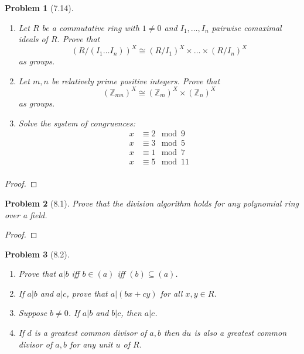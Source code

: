 \documentclass[10pt]{article}
\newcommand{\sk}{\vskip 10mm}
\newcommand{\bb}[1]{\mathbb{#1}}
\theoremstyle{plain}
\newtheorem{problem}{Problem}
\theoremstyle{remark}
\begin{document}
\begin{problem}[7.14]
  \begin{enumerate}
  \item Let $R$ be a commutative ring with $1\neq 0$ and $I_1,\ldots,I_n$
    pairwise comaximal ideals of $R$. Prove that
    \[ (R/(I_1\ldots I_n))^X\cong (R/I_1)^X\times\ldots\times(R/I_n)^X \]
    as groups.
  \item Let $m,n$ be relatively prime positive integers. Prove that
    \[ (\bb{Z}_{mn})^X\cong (\bb{Z}_m)^X\times(\bb{Z}_n)^X \]
    as groups.
  \item Solve the system of congruences:
    \begin{align*}
      x &\equiv 2 \mod 9\\
      x &\equiv 3 \mod 5\\
      x &\equiv 1 \mod 7\\
      x &\equiv 5 \mod 11\\
    \end{align*}
  \end{enumerate}
\end{problem}

\begin{proof}
  
\end{proof}

\sk

\begin{problem}[8.1]
  Prove that the division algorithm holds for any polynomial ring over a field.
\end{problem}

\begin{proof}
  
\end{proof}

\sk

\begin{problem}[8.2]
  \begin{enumerate}
  \item Prove that $a|b$ iff $b\in(a)$ iff $(b)\subseteq(a)$.
  \item If $a|b$ and $a|c$, prove that $a|(bx+cy)$ for all $x,y\in R$.
  \item Suppose $b\neq 0$. If $a|b$ and $b|c$, then $a|c$.
  \item If $d$ is a greatest common divisor of $a,b$ then $du$
    is also a greatest common divisor of $a,b$ for any unit $u$
    of $R$.
  \end{enumerate}
\end{problem}
\end{document}
